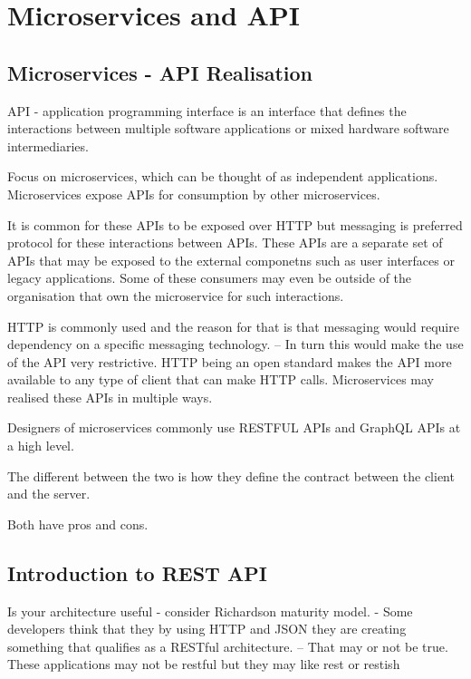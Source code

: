 
\chapter{Microservices and API}

\section{Microservices - API Realisation}
API - application programming interface is an interface that defines the interactions between multiple software applications or mixed hardware software intermediaries.

Focus on microservices, which can be thought of as independent applications.
Microservices expose APIs for consumption by other microservices.

It is common for these APIs to be exposed over HTTP but messaging is preferred protocol for these interactions between APIs.
These APIs are a separate set of APIs that may be exposed to the external componetns such as user interfaces or legacy applications.
Some of these consumers may even be outside of the organisation that own the microservice for such interactions.

HTTP is commonly used and the reason for that is that messaging would require dependency on a specific messaging technology.
-- In turn this would make the use of the API very restrictive.
HTTP being an open standard makes the API more available to any type of client that can make HTTP calls.
Microservices may realised these APIs in multiple ways.

Designers of microservices commonly use RESTFUL APIs and GraphQL APIs at a high level.

The different between the two is how they define the contract between the client and the server.

Both have pros and cons.

\section{Introduction to REST API}

Is your architecture useful - consider Richardson maturity model.
- Some developers think that they by using HTTP and JSON they are creating something that qualifies as a RESTful architecture.
-- That may or not be true.
These applications may not be restful but they may like rest or restish


